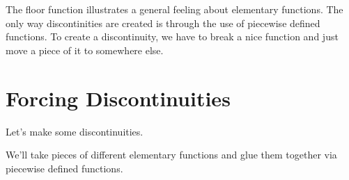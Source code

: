 \documentclass{ximera}
\begin{document}
The floor function illustrates a general feeling about elementary functions. The only way discontinities are created is through the use of piecewise defined functions.  To create a discontinuity, we have to break a nice function and just move a piece of it to somewhere else.











\section{Forcing Discontinuities}



Let's make some discontinuities.

We'll take pieces of different elementary functions and glue them together via piecewise defined functions. 
\end{document}
